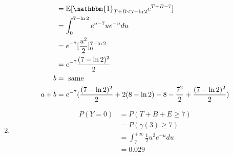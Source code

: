 \documentclass{article}
\theoremstyle{plain}%
\theoremstyle{definition}
\theoremstyle{remark}
\begin{document}
\begin{enumerate}
\begin{align*}
        &= \mathbb{E} [ \mathbbm{1}_{T +B < 7 - \ln 2} e^{T + B - 7}] \\ 
        &= \int_{0}^{7 - \ln 2}e^{u - 7 } u e^{-u} du \\
        &= e^{-7} [ \frac{u^2}{2}]^{7 - \ln 2}_{0} \\
        &= e^{-7} \frac{(7 - \ln 2)^2}{2} \\
        b &= \text{ same }\\
        a + b &= e^{-7} ( \frac{(7 - \ln 2)^2}{2} + 2 ( 8 - \ln 2) - 8 - \frac{7^2}{2} + \frac{(7 - \ln 2)^2}{2})
    \end{align*}
    \item \begin{align*}
        P(Y = 0) &= P(T+B+E \geq 7) \\
            &= P(\gamma (3) \geq 7) \\
            &= \int_{7}^{+\infty } \frac{1}{2} u^2 e^{-u}du \\
            &= 0.029
    \end{align*}
\end{enumerate}
\end{document}
